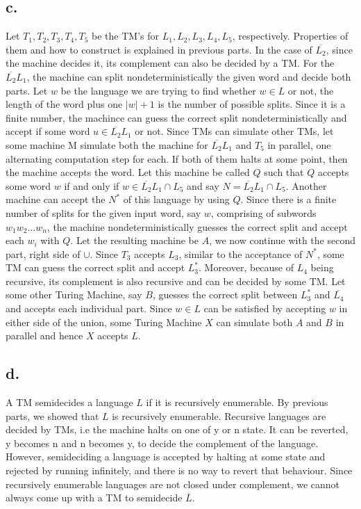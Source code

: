 \documentclass[12pt]{article}
\begin{document}
\subsection*{c.}
Let $T_1, T_2, T_3, T_4, T_5$ be the TM's for $L_1, L_2, L_3, L_4, L_5$, respectively. Properties of them and how to construct is explained in previous parts. In the case of $\overline{L_2}$, since the machine decides it, its complement can also be decided by a TM. For the $\overline{L_2}L_1$, the machine can split nondeterministically the given word and decide both parts. Let $w$ be the language we are trying to find whether $w\in L$ or not, the length of the word plus one $|w|+1$ is the number of possible splits. Since it is a finite number, the machince can guess the correct split nondeterministically and accept if some word $u\in\overline{L_2}L_1$ or not. Since TMs can simulate other TMs, let some machine M simulate both the machine for $\overline{L_2}L_1$ and $T_5$ in parallel, one alternating computation step for each.  If both of them halts at some point, then the machine accepts the word. Let this machine be called $Q$ such that $Q$ accepts some word $w$ if and only if $w\in\overline{L_2}L_1\cap L_5$ and say $N=\overline{L_2}L_1\cap L_5$. Another machine can accept the $N^*$ of this language by using $Q$. Since there is a finite number of splits for the given input word, say $w$, comprising of subwords $w_1w_2\dots w_n$, the machine nondeterministically guesses the correct split and accept each $w_i$ with $Q$. Let the resulting machine be $A$, we now continue with the second part, right side of $\cup$. Since $T_3$ accepts $L_3$, similar to the acceptance of $N^*$, some TM can guess the correct split and accept $L_3^*$. Moreover, because of $L_4$ being recursive, its complement is also recursive and can be decided by some TM. Let some other Turing Machine, say $B$, guesses the correct split between $L_3^*$ and $\overline{L_4}$ and accepts each individual part. Since $w\in L$ can be satisfied by accepting $w$ in either side of the union, some Turing Machine $X$ can simulate both $A$ and $B$ in parallel and hence $X$ accepts $L$. 
\subsection*{d.}
A TM semidecides a language $L$ if it is recursively enumerable. By previous parts, we showed that $L$ is recursively enumerable. Recursive languages are decided by TMs, i.e the machine halts on one of y or n state. It can be reverted, y becomes n and n becomes y, to decide the complement of the language. However, semideciding a language is accepted by halting at some state and rejected by running infinitely, and there is no way to revert that behaviour. Since recursively enumerable languages are not closed under complement, we cannot always come up with a TM to semidecide $\overline{L}$. 

\end{document}

